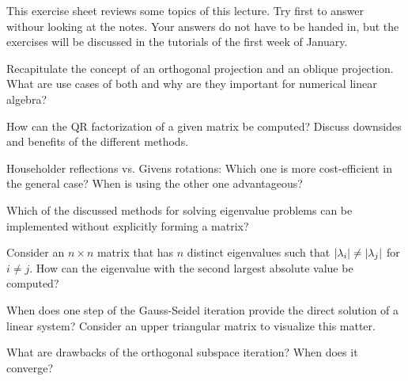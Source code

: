 
\begin{Sheet}
  \label{sheet10}

  This exercise sheet reviews some topics of this lecture. 
  Try first to answer withour looking at the notes.
  Your answers do not have to be handed in, 
  but the exercises will be discussed in the tutorials of the first week of January.

  \begin{Problem}
    Recapitulate the concept of an orthogonal projection and an
    oblique projection. What are use cases of both and why are they
    important for numerical linear algebra?
  \end{Problem}

  \begin{Problem}
    How can the QR factorization of a given matrix be computed?
    Discuss downsides and benefits of the different methods.
  \end{Problem}

  \begin{Problem}
    Householder reflections vs. Givens rotations: Which one is more
    cost-efficient in the general case? 
    When is using the other one advantageous?
  \end{Problem}

  \begin{Problem}
    Which of the discussed methods for solving eigenvalue problems can
    be implemented without explicitly forming a matrix?
  \end{Problem}

  \begin{Problem}
    Consider an $n\times n$ matrix that has $n$ distinct eigenvalues
    such that $\lvert\lambda_i\rvert \neq \lvert\lambda_j\rvert$ for $i\neq
    j$. How can the eigenvalue with the second largest absolute value
    be computed?
  \end{Problem}

  \begin{Problem}
    When does one step of the Gauss-Seidel iteration provide the
    direct solution of a linear system? Consider an upper triangular
    matrix to visualize this matter.
  \end{Problem}

  \begin{Problem}
	  What are drawbacks of the orthogonal subspace iteration?
	  When does it converge?
  \end{Problem}


\end{Sheet}
